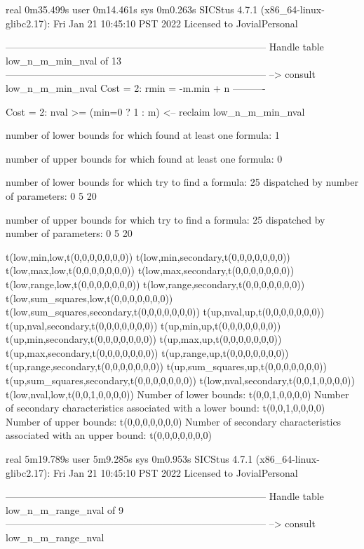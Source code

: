 real	0m35.499s
user	0m14.461s
sys	0m0.263s
SICStus 4.7.1 (x86_64-linux-glibc2.17): Fri Jan 21 10:45:10 PST 2022
Licensed to JovialPersonal


--------------------------------------------------------------------------------
Handle table low_n_m_min_nval of 13
--------------------------------------------------------------------------------
--> consult low_n_m_min_nval
Cost =  2:  rmin = -m.min + n
----------

Cost =  2:  nval >= (min=0 ? 1 : m)
<-- reclaim low_n_m_min_nval

number of lower bounds for which found at least one formula: 1

number of upper bounds for which found at least one formula: 0

number of lower bounds for which try to find a formula: 25
dispatched by number of parameters: 0  5  20

number of upper bounds for which try to find a formula: 25
dispatched by number of parameters: 0  5  20

t(low,min,low,t(0,0,0,0,0,0,0))
t(low,min,secondary,t(0,0,0,0,0,0,0))
t(low,max,low,t(0,0,0,0,0,0,0))
t(low,max,secondary,t(0,0,0,0,0,0,0))
t(low,range,low,t(0,0,0,0,0,0,0))
t(low,range,secondary,t(0,0,0,0,0,0,0))
t(low,sum_squares,low,t(0,0,0,0,0,0,0))
t(low,sum_squares,secondary,t(0,0,0,0,0,0,0))
t(up,nval,up,t(0,0,0,0,0,0,0))
t(up,nval,secondary,t(0,0,0,0,0,0,0))
t(up,min,up,t(0,0,0,0,0,0,0))
t(up,min,secondary,t(0,0,0,0,0,0,0))
t(up,max,up,t(0,0,0,0,0,0,0))
t(up,max,secondary,t(0,0,0,0,0,0,0))
t(up,range,up,t(0,0,0,0,0,0,0))
t(up,range,secondary,t(0,0,0,0,0,0,0))
t(up,sum_squares,up,t(0,0,0,0,0,0,0))
t(up,sum_squares,secondary,t(0,0,0,0,0,0,0))
t(low,nval,secondary,t(0,0,1,0,0,0,0))
t(low,nval,low,t(0,0,1,0,0,0,0))
Number of lower bounds:                                             t(0,0,1,0,0,0,0)
Number of secondary characteristics associated with a lower bound:  t(0,0,1,0,0,0,0)
Number of upper bounds:                                             t(0,0,0,0,0,0,0)
Number of secondary characteristics associated with an upper bound: t(0,0,0,0,0,0,0)

real	5m19.789s
user	5m9.285s
sys	0m0.953s
SICStus 4.7.1 (x86_64-linux-glibc2.17): Fri Jan 21 10:45:10 PST 2022
Licensed to JovialPersonal


--------------------------------------------------------------------------------
Handle table low_n_m_range_nval of 9
--------------------------------------------------------------------------------
--> consult low_n_m_range_nval

